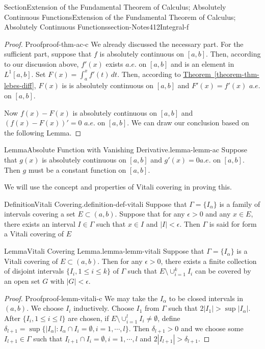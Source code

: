 \documentclass[oneside,10pt,]{article}
\newcommand{\xreffont}{\relax}
\numberwithin{equation}{section}
\begin{document}
\begin{sectionptx}{Section}{Extension of the Fundamental Theorem of Calculus; Absolutely Continuous Functions}{}{Extension of the Fundamental Theorem of Calculus; Absolutely Continuous Functions}{}{}{section-Notes412Integral-f}
\begin{proof}{Proof}{}{proof-thm-ac-c}
We already discussed the necessary	part. For the sufficient part, suppose that \(f\) is absolutely continuous on \([a, b]\). Then, according to our discussion above, \(f'(x)\) exists \(a.e.\) on \([a, b]\) and is an element in \(L^{1}[a,  b]\). Set \(F(x)=\int_{a}^{x} f'(t)\, dt\). Then, according to \hyperref[theorem-thm-lebes-diff]{Theorem~{\xreffont\ref{theorem-thm-lebes-diff}}}, \(F(x)\) is is absolutely continuous on \([a, b]\) and \(F'(x)=f'(x)\) \(a.e.\) on \([a, b]\).%
\par
Now \(f(x)-F(x)\) is  absolutely continuous on \([a, b]\) and \((f(x)-F(x))'=0\) \(a.e.\) on \([a, b]\). We can draw our conclusion based on the following Lemma.%
\end{proof}
\begin{lemma}{Lemma}{Absolute Function with Vanishing Derivative.}{}{lemma-lemm-ac}%
Suppose that \(g(x)\) is absolutely continuous on \([a, b]\) and \(g'(x)=0\)\(a.e.\) on \([a, b]\). Then \(g\) must be a constant function on \([a, b]\).\end{lemma}
We will use the concept and properties of Vitali covering in proving this.%
\begin{definition}{Definition}{Vitali Covering.}{definition-def-vitali}%
Suppose that \(\Gamma =\{I_{\alpha}\}\) is a family of intervals covering a set \(E\subset (a,b)\). Suppose that for any \(\epsilon >0\) and any \(x\in E\), there exists an interval \(I\in \Gamma\) such that \(x\in I\) and \(|I| < \epsilon\). Then \(\Gamma\) is said for form a Vitali covering of \(E\)%
\end{definition}
\begin{lemma}{Lemma}{Vitali Covering Lemma.}{}{lemma-lemm-vitali}%
Suppose that \(\Gamma =\{I_{\alpha}\}\) is a Vitali covering of \(E\subset (a,b)\). Then for any \(\epsilon > 0\), there exists a finite collection of disjoint intervals \(\{I_{i}, 1\le i \le k\}\) of \(\Gamma\) such that \(E\setminus \cup_{i=1}^{k}I_{i}\) can be covered by an open set \(G\) with \(|G| < \epsilon\).\end{lemma}
\begin{proof}{Proof}{}{proof-lemm-vitali-c}
We may take the \(I_{\alpha}\) to be closed intervals in \((a, b)\). We choose \(I_{i}\) inductively. Choose \(I_{1}\) from \(\Gamma\) such that \(2|I_{1}| > \sup |I_{\alpha}|\).  After \(\{I_{i}, 1\le i \le l\}\) are chosen, if \(E\setminus \cup_{i=1}^{l}I_{i} \ne \emptyset\), define \(\delta_{l+1}=\sup\{|I_{\alpha}|: I_{\alpha} \cap I_{i} =\emptyset, i=1,\cdots, l\}\). Then \(\delta_{l+1} > 0\) and we choose some \(I_{l+1}\in \Gamma\) such that \(I_{l+1} \cap I_{i} =\emptyset, i=1,\cdots, l\) and \(2|I_{l+1}| > \delta_{l+1}\).%

\end{proof}
\end{sectionptx}
\end{document}
